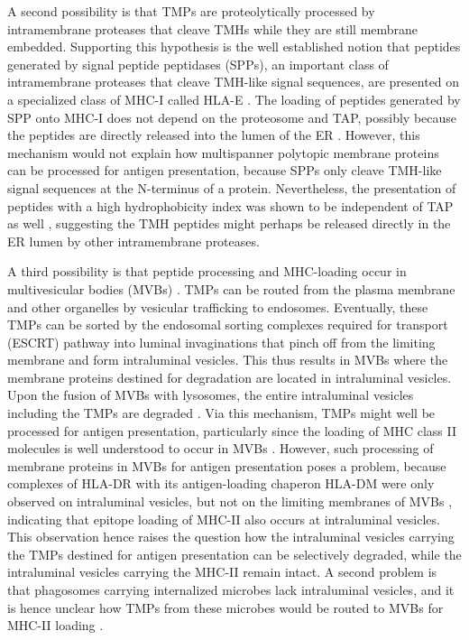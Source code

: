 A second possibility is that TMPs are proteolytically processed 
by intramembrane proteases that cleave TMHs while they are still membrane embedded. Supporting this hypothesis is the well established notion that peptides generated by signal peptide peptidases (SPPs), an important class of intramembrane proteases that cleave TMH-like signal sequences, 
are presented on a specialized class of MHC-I called HLA-E \cite{oliveira2015alternative}. 
The loading of peptides generated by SPP onto MHC-I does not depend on the proteosome and TAP, 
possibly because the peptides are directly released into the lumen of the ER \cite{oliveira2015alternative}. 
However, this mechanism would not explain how multispanner polytopic membrane proteins can be processed for antigen presentation, because SPPs only cleave TMH-like signal sequences at the N-terminus of a protein. 
Nevertheless, the presentation of peptides with a high hydrophobicity index 
was shown to be independent of TAP as well \cite{lautscham2001processing}, 
suggesting the TMH peptides might perhaps be released directly in the ER lumen by other intramembrane proteases. 

A third possibility is that peptide processing and MHC-loading occur in multivesicular bodies (MVBs) \cite{oliveira2015alternative}. 
TMPs can be routed from the plasma membrane and other organelles by vesicular trafficking to endosomes. Eventually, these TMPs can be sorted by the endosomal sorting complexes required for transport (ESCRT) pathway into luminal invaginations that pinch off from the limiting membrane and form intraluminal vesicles. This thus results in MVBs where the membrane proteins destined for degradation are located in intraluminal vesicles. Upon the fusion of MVBs with lysosomes, 
the entire intraluminal vesicles including the TMPs are degraded \cite{gruenberg2020life}. 
Via this mechanism, TMPs might well be processed for antigen presentation, 
particularly since the loading of MHC class II molecules is well understood 
to occur in MVBs \cite{kleijmeer2001reorganization,peters1991segregation,zwart2005spatial}. 
However, such processing of membrane proteins in MVBs for antigen presentation poses a problem, because complexes of HLA-DR with its antigen-loading chaperon HLA-DM were only observed on intraluminal vesicles, 
but not on the limiting membranes of MVBs \cite{zwart2005spatial}, 
indicating that epitope loading of MHC-II also occurs at intraluminal vesicles. This observation hence raises the question how the intraluminal vesicles carrying the TMPs destined for antigen presentation can be selectively degraded, while the intraluminal vesicles carrying the MHC-II remain intact. A second problem is that phagosomes carrying internalized microbes lack intraluminal vesicles, 
and it is hence unclear how TMPs from these microbes 
would be routed to MVBs for MHC-II loading \cite{zwart2005spatial}.

